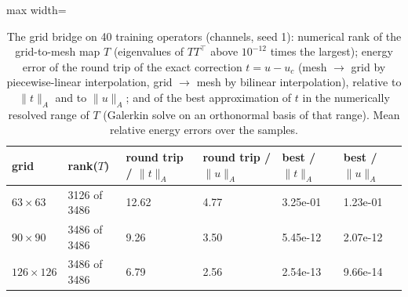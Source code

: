\begin{table}[tbp]\centering\footnotesize\setlength{\tabcolsep}{4pt}
\caption{The grid bridge on 40 training operators (channels, seed 1): numerical rank of the grid-to-mesh map $T$ (eigenvalues of $TT^\top$ above $10^{-12}$ times the largest); energy error of the round trip of the exact correction $t=u-u_c$ (mesh $\to$ grid by piecewise-linear interpolation, grid $\to$ mesh by bilinear interpolation), relative to $\|t\|_A$ and to $\|u\|_A$; and of the best approximation of $t$ in the numerically resolved range of $T$ (Galerkin solve on an orthonormal basis of that range). Mean relative energy errors over the samples.}\label{tab:bridge}
\begin{adjustbox}{max width=\linewidth}
\begin{tabular}{llllll}\toprule
grid & rank($T$) & round trip / $\|t\|_A$ & round trip / $\|u\|_A$ & best / $\|t\|_A$ & best / $\|u\|_A$ \\\midrule
$63\times63$ & 3126 of 3486 & 12.62 & 4.77 & 3.25e-01 & 1.23e-01 \\
$90\times90$ & 3486 of 3486 & 9.26 & 3.50 & 5.45e-12 & 2.07e-12 \\
$126\times126$ & 3486 of 3486 & 6.79 & 2.56 & 2.54e-13 & 9.66e-14 \\
\bottomrule\end{tabular}
\end{adjustbox}
\end{table}
